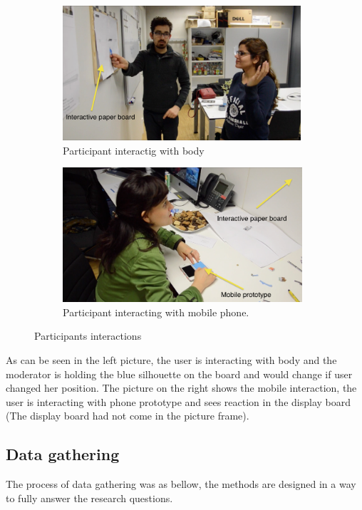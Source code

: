 \begin{figure}[H]
    \centering
    \begin{subfigure}[H]{0.48\textwidth}
        \centering
        \includegraphics[width=\textwidth,height=5cm]{Figures/5/body}
        \caption{Participant interactig with body}
        \label{fig:screen_proto_inter}
    \end{subfigure}
    \begin{subfigure}[H]{0.48\textwidth}
        \centering
        \includegraphics[width=\textwidth,height=5cm]{Figures/5/mobile}
        \caption{Participant interacting with mobile phone.}
        \label{fig:mobileproto_inter}
    \end{subfigure}
    \caption{Participants interactions}
    \label{fig:paper_prototype_screen}
\end{figure}

As can be seen in the left picture, the user is interacting with body and the moderator is holding the blue silhouette on the board and would change if user changed her position. The picture on the right shows the mobile interaction, the user is interacting with phone prototype and sees reaction in the display board (The display board had not come in the picture frame).

\subsection{Data gathering}
The process of data gathering was as bellow, the methods are designed in a way to fully answer the research questions.


